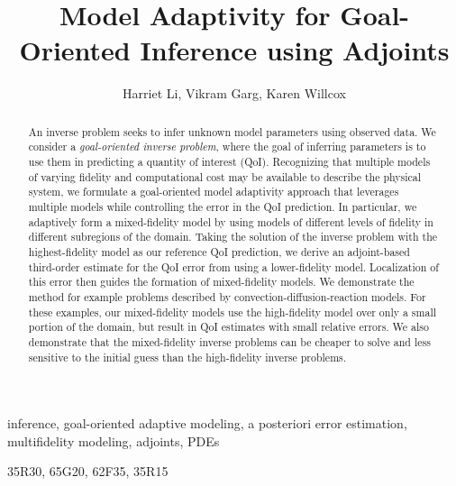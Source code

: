 \documentclass[review]{siamart0516}
\providecommand{\DIFdelbegin}{} %
\providecommand{\DIFdelend}{} %
\newcommand{\DIFscaledelfig}{0.5}
\newlength{\DIFdelgraphicswidth} %
\newlength{\DIFdelgraphicsheight} %
\newcommand{\DIFdelincludegraphics}[2][]{%
\sbox{\DIFdelgraphicsbox}{\DIFOincludegraphics[#1]{#2}}%
\settoboxwidth{\DIFdelgraphicswidth}{\DIFdelgraphicsbox} %
\settoboxtotalheight{\DIFdelgraphicsheight}{\DIFdelgraphicsbox} %
\scalebox{\DIFscaledelfig}{%
\parbox[b]{\DIFdelgraphicswidth}{\usebox{\DIFdelgraphicsbox}\\[-\baselineskip] \rule{\DIFdelgraphicswidth}{0em}}\llap{\resizebox{\DIFdelgraphicswidth}{\DIFdelgraphicsheight}{%
\setlength{\unitlength}{\DIFdelgraphicswidth}%
\begin{picture}(1,1)%
\thicklines\linethickness{2pt} %
{\color[rgb]{1,0,0}\put(0,0){\framebox(1,1){}}}%
{\color[rgb]{1,0,0}\put(0,0){\line( 1,1){1}}}%
{\color[rgb]{1,0,0}\put(0,1){\line(1,-1){1}}}%
\end{picture}%
}\hspace*{3pt}}} %
} %
\DeclareRobustCommand{\DIFdelbegin}{\DIFOdelbegin \let\includegraphics\DIFdelincludegraphics} %
\DeclareRobustCommand{\DIFdelend}{\DIFOaddend \let\includegraphics\DIFOincludegraphics} %
\begin{document}
\raggedbottom %

\title{Model Adaptivity for Goal-Oriented Inference using Adjoints}

\author{Harriet Li, Vikram Garg, Karen Willcox}
\maketitle

\begin{abstract}
An inverse problem seeks to infer unknown model parameters using observed data. We consider a \textit{goal-oriented inverse problem}, where the goal of inferring parameters is to use them in predicting a quantity of interest (QoI). Recognizing that multiple models of varying fidelity and computational cost may be available to describe the physical system, we formulate a goal-oriented model adaptivity approach that leverages multiple models while controlling the error in the QoI prediction. In particular, we adaptively form a mixed-fidelity model by using models of different levels of fidelity in different subregions of the domain. Taking the solution of the inverse problem with the highest-fidelity model as our reference QoI prediction, we derive an adjoint-based third-order estimate for the QoI error from using a lower-fidelity model. Localization of this error then guides the formation of mixed-fidelity models. We demonstrate the method for example problems described by convection-diffusion-reaction models. For these examples, our mixed-fidelity models use the high-fidelity model over only a small portion of the domain, but result in QoI estimates with small relative errors. We also demonstrate that the mixed-fidelity inverse problems can be cheaper to solve and less sensitive to the initial guess than the high-fidelity inverse problems.


\DIFdelbegin %

\DIFdelend \end{abstract}

\begin{keywords}
  inference, goal-oriented adaptive modeling, a posteriori error estimation, multifidelity modeling, adjoints, PDEs
\end{keywords}

\begin{AMS}
  35R30, 65G20, 62F35, 35R15
\end{AMS}
\end{document}
